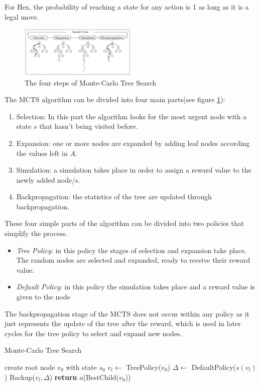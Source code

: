 \documentclass{ba-kecs}
\begin{document}
For Hex, the probability of reaching a state for any action is 1 as long as it is a legal move. 
\begin{figure}
	\centering
	\includegraphics[width=0.5\textwidth]{figure_mcts.jpg}
	\caption{The four steps of Monte-Carlo Tree Search \cite{chaslot2008progressive}}
	\label{fig:mcts}
	\end{figure}
The MCTS algorithm can be divided into four main parts(see figure \ref{fig:mcts}): 
\begin{enumerate}
\item Selection: In this part the algorithm looks for the most urgent node with a state $s$ that hasn't being visited before.
\item Expansion: one or more nodes are expanded by adding leaf nodes according the values left in $A$.
\item Simulation: a simulation takes place in order to assign a reward value to the newly added node/s.
\item Backpropagation: the statistics of the tree are updated through backpropagation.
\end{enumerate}

These four simple parts of the algorithm can be divided into two policies that simplify the process.
\begin{itemize}
\item \textit{Tree Policy}: in this policy the stages of selection and expansion take place. The random nodes are selected and expanded, ready to receive their reward value.
\item \textit{Default Policy}: in this policy the simulation takes place and a reward value is given to the node 
\end{itemize}
The backpropagation stage of the MCTS does not occur within any policy as it just represents the update of the tree after the reward, which is used in later cycles for the tree policy to select and expand new nodes.



\begin{algorithm}
    \caption{Monte-Carlo Tree Search}
    \label{alg:MCTS}
    \begin{algorithmic}
            \State create root node $v_0$ with state $s_0$
                \State $v_l \gets$ TreePolicy($v_0$)
                \State $ \Delta \gets$ DefaultPolicy($s(v_l)$)
                \State Backup($v_l, \Delta$)
            \EndWhile\label{}
            \State \textbf{return} $a$(BestChild($v_0$))
        \EndProcedure
    \end{algorithmic}
\end{algorithm}
\end{document}
